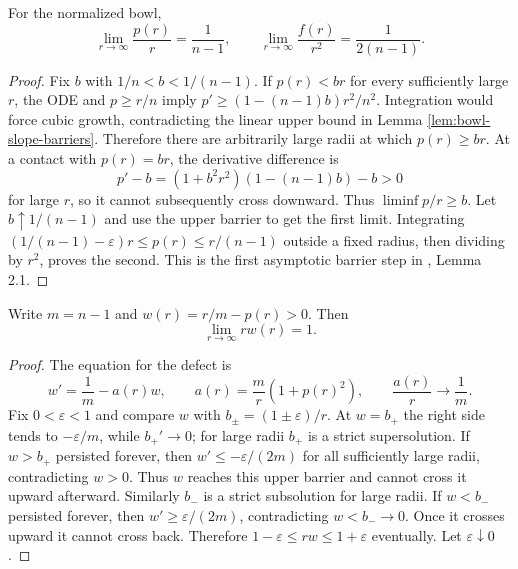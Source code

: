 \begin{proposition}\label{prop:bowl-leading-growth}
For the normalized bowl,
\[
 \lim_{r\to\infty}\frac{p(r)}r=\frac1{n-1},\qquad
 \lim_{r\to\infty}\frac{f(r)}{r^2}=\frac1{2(n-1)}.
\]
\end{proposition}
\begin{proof}
Fix $b$ with $1/n<b<1/(n-1)$. If $p(r)<br$ for every sufficiently large $r$, the ODE and $p\geq r/n$ imply $p'\geq(1-(n-1)b)r^2/n^2$. Integration would force cubic growth, contradicting the linear upper bound in Lemma \ref{lem:bowl-slope-barriers}. Therefore there are arbitrarily large radii at which $p(r)\geq br$. At a contact with $p(r)=br$, the derivative difference is
\[
 p'-b=(1+b^2r^2)(1-(n-1)b)-b>0
\]
for large $r$, so it cannot subsequently cross downward. Thus $\liminf p/r\geq b$. Let $b\uparrow1/(n-1)$ and use the upper barrier to get the first limit. Integrating $(1/(n-1)-\varepsilon)r\leq p(r)\leq r/(n-1)$ outside a fixed radius, then dividing by $r^2$, proves the second. This is the first asymptotic barrier step in \cite{CSS07}, Lemma 2.1.
\end{proof}

\begin{lemma}\label{lem:bowl-slope-correction}
Write $m=n-1$ and $w(r)=r/m-p(r)>0$. Then
\[
 \lim_{r\to\infty}rw(r)=1.
\]
\end{lemma}
\begin{proof}
The equation for the defect is
\[
 w'=\frac1m-a(r)w,\qquad a(r)=\frac m r(1+p(r)^2),
 \qquad \frac{a(r)}r\longrightarrow\frac1m.
\]
Fix $0<\varepsilon<1$ and compare $w$ with $b_\pm=(1\pm\varepsilon)/r$. At $w=b_+$ the right side tends to $-\varepsilon/m$, while $b_+'\to0$; for large radii $b_+$ is a strict supersolution. If $w>b_+$ persisted forever, then $w'\leq-\varepsilon/(2m)$ for all sufficiently large radii, contradicting $w>0$. Thus $w$ reaches this upper barrier and cannot cross it upward afterward. Similarly $b_-$ is a strict subsolution for large radii. If $w<b_-$ persisted forever, then $w'\geq\varepsilon/(2m)$, contradicting $w<b_-\to0$. Once it crosses upward it cannot cross back. Therefore $1-\varepsilon\leq rw\leq1+\varepsilon$ eventually. Let $\varepsilon\downarrow0$.
\end{proof}

